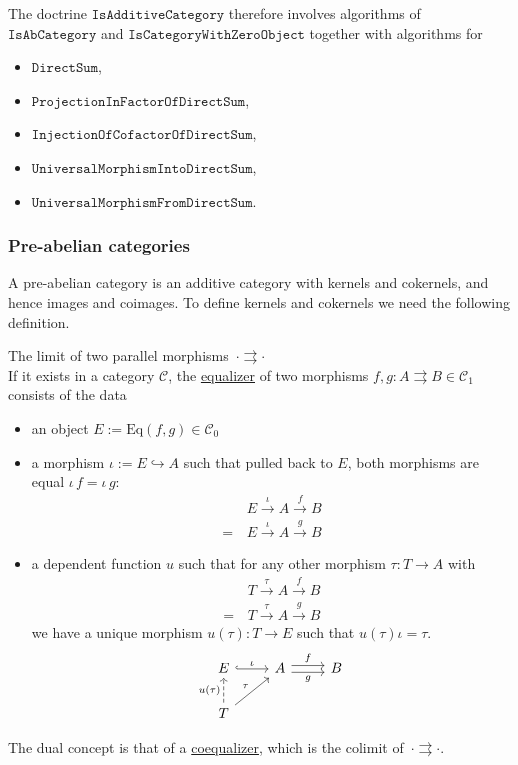 \begin{doctrine}
The doctrine $\mathtt{IsAdditiveCategory}$ therefore involves algorithms of $\mathtt{IsAbCategory}$ and
$\mathtt{IsCategoryWithZeroObject}$ together with algorithms for
\begin{itemize}
 \item $\mathtt{DirectSum}$,
 \item $\mathtt{ProjectionInFactorOfDirectSum}$,
 \item $\mathtt{InjectionOfCofactorOfDirectSum}$,
 \item $\mathtt{UniversalMorphismIntoDirectSum}$,
 \item $\mathtt{UniversalMorphismFromDirectSum}$.
\end{itemize}
\end{doctrine}

\subsubsection{Pre-abelian categories}

A pre-abelian category is an additive category with kernels and cokernels, and hence images and coimages. To define
kernels and cokernels we need the following definition.

\begin{definition}
The limit of two parallel morphisms $\,\cdot \rightrightarrows \cdot$\\
If it exists in a category $\mathcal{C}$, the \ul{equalizer} of two morphisms $f, g : A \rightrightarrows B \in \mathcal{C}_{1}$
consists of the data
\begin{itemize}
\item an object $E := \mathrm{Eq}(f,g) \in \mathcal{C}_{0}$
\item a morphism $\iota := E \hookrightarrow A$ such that pulled back to $E$, both morphisms are equal $\iota\,f = \iota\,g$:
\begin{align*}
&E \xrightarrow{\iota} A \xrightarrow{f} B \\
=\, &E \xrightarrow{\iota} A \xrightarrow{g} B
\end{align*}
\item a dependent function $u$ such that for any other morphism $\tau : T \rightarrow A$ with
\begin{align*}
&T \xrightarrow{\tau} A \xrightarrow{f} B \\
=\, &T \xrightarrow{\tau} A \xrightarrow{g} B
\end{align*}
we have a unique morphism $u( \tau ) : T \rightarrow E$ such that $u( \tau ) \iota = \tau$.
\[
\begin{tikzcd}
E \arrow[r, "\iota", hook]                              & A \arrow[r, "f", shift left] \arrow[r, "g"', shift right] & B \\
T \arrow[ru, "\tau"] \arrow[u, "u(\tau)", dashed] &                                                           &  
\end{tikzcd}
\]
\end{itemize}
The dual concept is that of a \ul{coequalizer}, which is the colimit of $\,\cdot \rightrightarrows \cdot$.
\end{definition}

